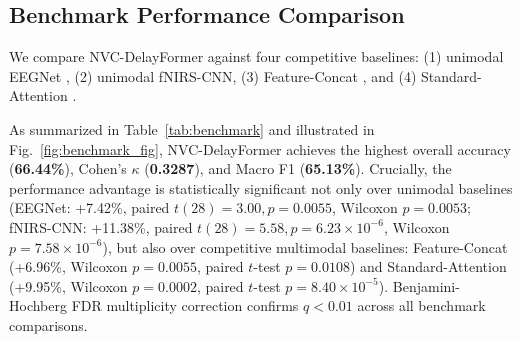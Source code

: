 \documentclass[journal]{IEEEtran}
\begin{document}
\subsection{Benchmark Performance Comparison}
We compare NVC-DelayFormer against four competitive baselines: (1) unimodal EEGNet \cite{lawhern2018eegnet}, (2) unimodal fNIRS-CNN, (3) Feature-Concat \cite{fazli2012enhanced}, and (4) Standard-Attention \cite{vaswani2017attention}.

\begin{table}[!t]
\caption{29-Fold Full LOSO Benchmark Comparison (Real TU Berlin Cohort, $N=29$ Subjects, 1,740 Real Trials)}
\label{tab:benchmark}
\centering
{}
\end{table}

As summarized in Table~\ref{tab:benchmark} and illustrated in Fig.~\ref{fig:benchmark_fig}, NVC-DelayFormer achieves the highest overall accuracy (\textbf{66.44\%}), Cohen's $\kappa$ (\textbf{0.3287}), and Macro F1 (\textbf{65.13\%}). Crucially, the performance advantage is statistically significant not only over unimodal baselines (EEGNet: +7.42\%, paired $t(28) = 3.00, p = 0.0055$, Wilcoxon $p = 0.0053$; fNIRS-CNN: +11.38\%, paired $t(28) = 5.58, p = 6.23 \times 10^{-6}$, Wilcoxon $p = 7.58 \times 10^{-6}$), but also over competitive multimodal baselines: Feature-Concat (+6.96\%, Wilcoxon $p = 0.0055$, paired $t$-test $p = 0.0108$) and Standard-Attention (+9.95\%, Wilcoxon $p = 0.0002$, paired $t$-test $p = 8.40 \times 10^{-5}$). Benjamini-Hochberg FDR multiplicity correction confirms $q < 0.01$ across all benchmark comparisons.
\end{document}
